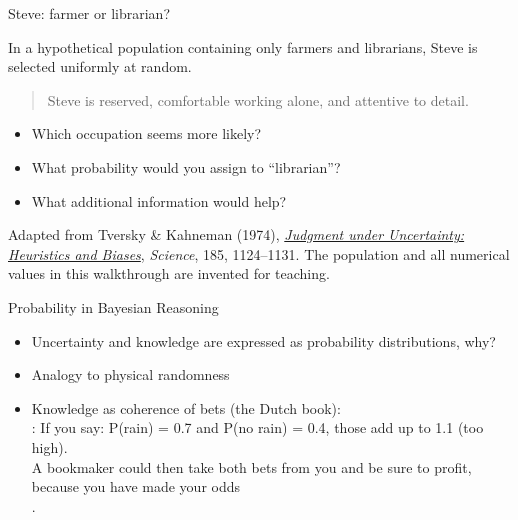 \documentclass[10pt]{beamer}
\begin{document}
\begin{frame}{Steve: farmer or librarian?}

  In a hypothetical population containing only farmers and librarians,
  Steve is selected uniformly at random.

  \begin{quote}
    Steve is reserved, comfortable working alone, and attentive to detail.
  \end{quote}

  \begin{itemize}
  \item Which occupation seems more likely?
  \item What probability would you assign to ``librarian''?
  \item What additional information would help?
  \end{itemize}


  \medskip
  {\footnotesize Adapted from Tversky \& Kahneman (1974),
    \href{https://doi.org/10.1126/science.185.4157.1124}{\textit{Judgment under
    Uncertainty: Heuristics and Biases}}, \textit{Science}, 185, 1124--1131.
    The population and all numerical values in this walkthrough are
    invented for teaching.}

\end{frame}


\begin{frame}{Probability in Bayesian Reasoning}

  \begin{itemize}
  \item Uncertainty and knowledge are expressed as probability distributions, why? \pause
    \item Analogy to physical randomness\pause
    \item Knowledge as coherence of bets (the Dutch book):
     \\ : If you say: P(rain) = 0.7 and P(no rain) = 0.4, those add up to 1.1 (too high).\\
A bookmaker could then take both bets from you and be sure to profit, because you have made your odds \\ .
  \end{itemize}
\end{frame}
\end{document}
